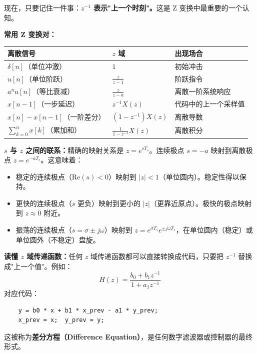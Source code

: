 \documentclass[UTF8]{ctexart}
\begin{document}
现在，只要记住一件事：\textbf{$z^{-1}$ 表示"上一个时刻"。}这是 Z 变换中最重要的一个认知。

\textbf{常用 Z 变换对：}

\begin{center}
\begin{tabular}{lll}
\toprule
\textbf{离散信号} & \textbf{$z$ 域} & \textbf{出现场合} \\
\midrule
$\delta[n]$（单位冲激） & $1$ & 初始冲击 \\
$u[n]$（单位阶跃） & $\frac{z}{z-1}$ & 阶跃指令 \\
$a^n u[n]$（等比衰减） & $\frac{z}{z-a}$ & 离散一阶系统响应 \\
$x[n-1]$（一步延迟） & $z^{-1}X(z)$ & 代码中的上一个采样值 \\
$x[n] - x[n-1]$（一阶差分） & $(1 - z^{-1})X(z)$ & 离散导数 \\
$\sum_{k=0}^{n} x[k]$（累加和） & $\frac{1}{1 - z^{-1}}X(z)$ & 离散积分 \\
\bottomrule
\end{tabular}
\end{center}

\textbf{$s$ 与 $z$ 之间的联系：}精确的映射关系是 $z = e^{sT_s}$。连续极点 $s = -a$ 映射到离散极点 $z = e^{-aT_s}$。这意味着：
\begin{itemize}
    \item 稳定的连续极点（$\text{Re}(s) < 0$）映射到 $|z| < 1$（单位圆内）。稳定性得以保持。
    \item 更快的连续极点（$s$ 更负）映射到更小的 $|z|$（更靠近原点）。极快的极点映射到 $z \approx 0$ 附近。
    \item 振荡的连续极点（$s = \sigma \pm j\omega$）映射到 $z = e^{\sigma T_s} e^{\pm j\omega T_s}$，在单位圆内（稳定）或单位圆外（不稳定）盘旋。
\end{itemize}

\textbf{读懂 $z$ 域传递函数：}任何 $z$ 域传递函数都可以直接转换成代码，只要把 $z^{-1}$ 替换成"上一个值"。例如：
\[
H(z) = \frac{b_0 + b_1 z^{-1}}{1 + a_1 z^{-1}}
\]
对应代码：
\begin{verbatim}
    y = b0 * x + b1 * x_prev - a1 * y_prev;
    x_prev = x;  y_prev = y;
\end{verbatim}
这被称为\textbf{差分方程（Difference Equation）}，是任何数字滤波器或控制器的最终形式。

\newpage
\end{document}
